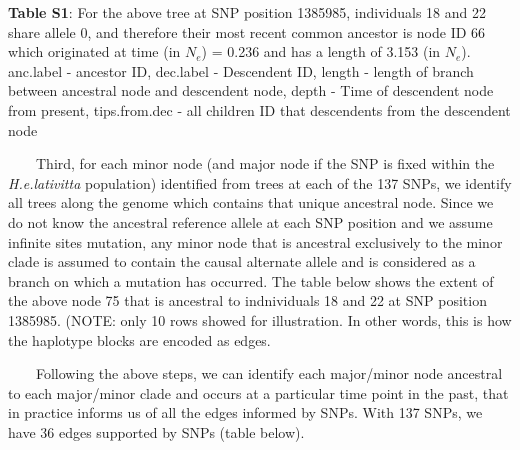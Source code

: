 \documentclass[
]{article}
\begin{document}
\textbf{Table S1}: For the above tree at SNP position 1385985,
individuals 18 and 22 share allele 0, and therefore their most recent
common ancestor is node ID 66 which originated at time (in \(N_e\)) =
0.236 and has a length of 3.153 (in \(N_e\)). anc.label - ancestor ID,
dec.label - Descendent ID, length - length of branch between ancestral
node and descendent node, depth - Time of descendent node from present,
tips.from.dec - all children ID that descendents from the descendent
node

  Third, for each minor node (and major node if the SNP is fixed within
the \emph{H.e.lativitta} population) identified from trees at each of
the 137 SNPs, we identify all trees along the genome which contains that
unique ancestral node. Since we do not know the ancestral reference
allele at each SNP position and we assume infinite sites mutation, any
minor node that is ancestral exclusively to the minor clade is assumed
to contain the causal alternate allele and is considered as a branch on
which a mutation has occurred. The table below shows the extent of the
above node 75 that is ancestral to indnividuals 18 and 22 at SNP
position 1385985. (NOTE: only 10 rows showed for illustration. In other
words, this is how the haplotype blocks are encoded as edges.

  Following the above steps, we can identify each major/minor node
ancestral to each major/minor clade and occurs at a particular time
point in the past, that in practice informs us of all the edges informed
by SNPs. With 137 SNPs, we have 36 edges supported by SNPs (table
below).
\end{document}
